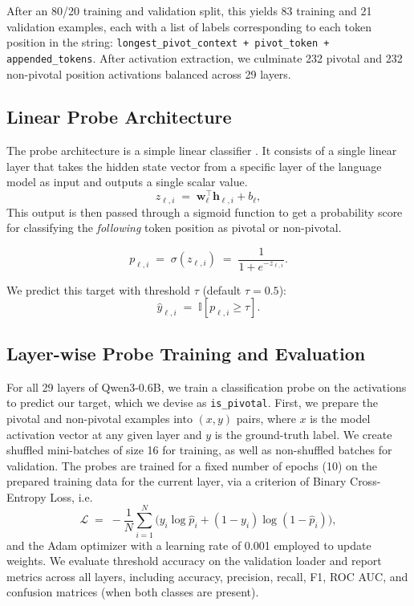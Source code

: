 \documentclass[11pt]{article}
\begin{document}
After an 80/20 training and validation split, this yields 83 training and 21 validation examples, each with a list of labels corresponding to each token position in the string: \texttt{longest\_pivot\_context + pivot\_token + appended\_tokens}. After activation extraction, we culminate 232 pivotal and 232 non-pivotal position activations balanced across 29 layers.

\subsection{Linear Probe Architecture}

The probe architecture is a simple linear classifier \cite{alain2018understandingintermediatelayersusing}. It consists of a single linear layer that takes the hidden state vector from a specific layer of the language model as input and outputs a single scalar value. \[
z_{\ell,i} \;=\; \mathbf{w}_\ell^\top \mathbf{h}_{\ell,i} + b_\ell,
\]
This output is then passed through a sigmoid function to get a probability score for classifying the \emph{following} token position as pivotal or non-pivotal.

\[
p_{\ell,i} \;=\; \sigma\!\left(z_{\ell,i}\right) \;=\; \frac{1}{1 + e^{-z_{\ell,i}}}.
\]

We predict this target with threshold $\tau$ (default $\tau{=}0.5$):
\[
\hat{y}_{\ell,i} \;=\; \mathbb{I}\!\left[p_{\ell,i} \ge \tau\right].
\]

\subsection{Layer-wise Probe Training and Evaluation}
For all 29 layers of Qwen3-0.6B, we train a classification probe on the activations to predict our target, which we devise as \texttt{is\_pivotal}. First, we prepare the pivotal and non-pivotal examples into $(x,y)$ pairs, where $x$ is the model activation vector at any given layer and $y$ is the ground-truth label. We create shuffled mini-batches of size 16 for training, as well as non-shuffled batches for validation. The probes are trained for a fixed number of epochs (10) on the prepared training data for the current layer, via a criterion of Binary Cross-Entropy Loss, i.e. \[
\mathcal{L} \;=\; -\frac{1}{N}\sum_{i=1}^N \Big( y_i \log \hat{p}_i + (1-y_i)\log (1-\hat{p}_i) \Big),\]
and the Adam optimizer with a learning rate of 0.001 employed to update weights. We evaluate threshold accuracy on the validation loader and report metrics across all layers, including accuracy, precision, recall, F1, ROC AUC, and confusion matrices (when both classes are present).
\end{document}
